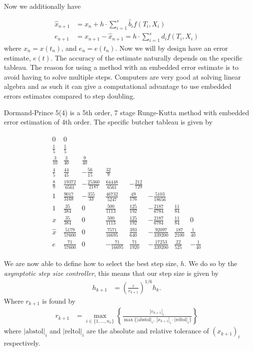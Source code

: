 Now we additionally have 

\begin{align}
    \hat x_{n+1} &= x_n + h \cdot \sum_{i=1}^s \hat b_i f(T_i,X_i) \\
    e_{n+1} &= x_{n+1} - \hat x_{n+1} = h \cdot \sum_{i=1}^s d_i f(T_i,X_i)
\end{align}
where $x_n=x(t_n)$, and $e_n = e(t_n)$. Now we will by design have an error estimate, $e(t)$. The accuracy of the estimate naturally depends on the specific tableau. The reason for using a method with an embedded error estimate is to avoid having to solve multiple steps. Computers are very good at solving linear algebra and as such it can give a computational advantage to use embedded errors estimates compared to step doubling. 

Dormand-Prince 5(4) is a 5th order, 7 stage Runge-Kutta method with embedded error estimation of 4th order. The specific butcher tableau is given by 

\begin{align}
        \begin{array}{c|ccccccc}
0	&0 &&&&&& \\
\frac{1}{5}	&\frac{1}{5} &&&&&& \\
\frac{3}{10}	&\frac{3}{40}	&\frac{9}{40} &&&&& \\
\frac{4}{5}	&\frac{44}{45}	&-\frac{56}{15}	&\frac{32}{9} &&&& \\
\frac{8}{9}	& \frac{19372}{6561}	&-\frac{25360}{2187}	& \frac{64448}{6561}	&-\frac{212}{729} &&& \\
1	&\frac{9017}{3168}	&-\frac{355}{33}	&\frac{46732}{5247}	&\frac{49}{176}	&-\frac{5103}{18656} && \\
1	&\frac{35}{384}	&0	&\frac{500}{1113}	&\frac{125}{192}	&-\frac{2187}{6784}	&\frac{11}{84}	& \\ \hline
x& \frac{35}{384}	&0	&\frac{500}{1113}	&\frac{125}{192}	&-\frac{2187}{6784}	&\frac{11}{84}	&0 \\
\hat{x}&\frac{5179}{57600}	&0	&\frac{7571}{16695}	&\frac{393}{640}	&-\frac{92097}{339200}	&\frac{187}{2100}	&\frac{1}{40} \\ \hline
e & \frac{71}{57600} &0 & -\frac{71}{16695} &\frac{71}{1920} &-\frac{17253}{339200} & \frac{22}{525} &-\frac{1}{40}
    \end{array}
\end{align}

We are now able to define how to select the best step size, $h$. We do so by the \textit{asymptotic step size controller}, this means that our step size is given by
\begin{align}
    h_{k+1} &= \left(\frac{\varepsilon}{r_{k+1}} \right )^{1/6} h_k.
\end{align}
Where $r_{k+1}$ is found by
\begin{align}
    r_{k+1} &= \max_{i \in \{1,...,n_x\}} \left \{ \frac{|e_{k+1}|_i}{ \max \{ |\text{abstol}|_i, \ |x_{k+1}|_i \cdot |\text{reltol}|_i \} } \right \}
\end{align}
where $|\text{abstol}|_i$ and $|\text{reltol}|_i$ are the absolute and relative tolerance of $(x_{k+1})_i$ respectively.

